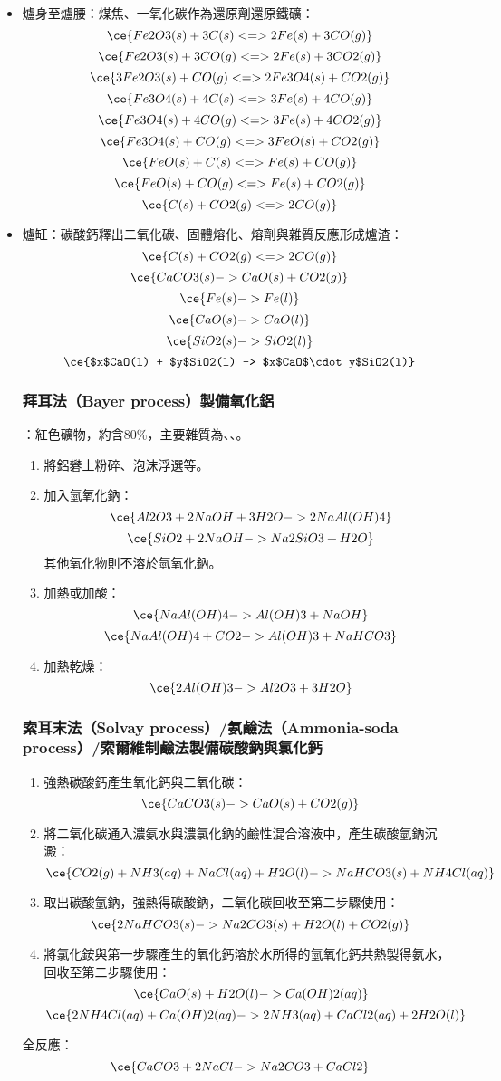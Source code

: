 \documentclass[a4paper,12pt]{report}
\begin{document}
\begin{itemize}
\item 爐身至爐腰：煤焦、一氧化碳作為還原劑還原鐵礦：
\[\ce{Fe2O3(s) + 3C(s) <=> 2Fe(s) + 3CO(g)}\]
\[\ce{Fe2O3(s) + 3CO(g) <=> 2Fe(s) + 3CO2(g)}\]
\[\ce{3Fe2O3(s) + CO(g) <=> 2Fe3O4(s) + CO2(g)}\]
\[\ce{Fe3O4(s) + 4C(s) <=> 3Fe(s) + 4CO(g)}\]
\[\ce{Fe3O4(s) + 4CO(g) <=> 3Fe(s) + 4CO2(g)}\]
\[\ce{Fe3O4(s) + CO(g) <=> 3FeO(s) + CO2(g)}\]
\[\ce{FeO(s) + C(s) <=> Fe(s) + CO(g)}\]
\[\ce{FeO(s) + CO(g) <=> Fe(s) + CO2(g)}\]
\[\ce{C(s) + CO2(g) <=> 2CO(g)}\]
\item 爐缸：碳酸鈣釋出二氧化碳、固體熔化、熔劑與雜質反應形成爐渣：
\[\ce{C(s) + CO2(g) <=> 2CO(g)}\]
\[\ce{CaCO3(s) -> CaO(s) + CO2(g)}\]
\[\ce{Fe(s) -> Fe(l)}\]
\[\ce{CaO(s) -> CaO(l)}\]
\[\ce{SiO2(s) -> SiO2(l)}\]
\[\ce{$x$CaO(l) + $y$SiO2(l) -> $x$CaO$\cdot y$SiO2(l)}\]
\eit
{}
\subsubsection{拜耳法（Bayer process）製備氧化鋁}
：紅色礦物，約含80\%，主要雜質為、、。
\begin{enumerate}
\item 將鋁礬土粉碎、泡沫浮選等。
\item 加入氫氧化鈉：
\[\ce{Al2O3 + 2NaOH + 3H2O -> 2NaAl(OH)4}\]
\[\ce{SiO2 + 2NaOH -> Na2SiO3 + H2O}\]
其他氧化物則不溶於氫氧化鈉。
\item 加熱或加酸：
\[\ce{NaAl(OH)4 -> Al(OH)3 + NaOH}\]
\[\ce{NaAl(OH)4 + CO2 -> Al(OH)3 + NaHCO3}\]
\item 加熱乾燥：
\[\ce{2Al(OH)3 -> Al2O3 + 3H2O}\]
\end{enumerate}
\subsubsection{索耳末法（Solvay process）/氨鹼法（Ammonia-soda process）/索爾維制鹼法製備碳酸鈉與氯化鈣}
\begin{enumerate}
\item 強熱碳酸鈣產生氧化鈣與二氧化碳：
\[\ce{CaCO3(s) -> CaO(s) + CO2(g)}\]
\item 將二氧化碳通入濃氨水與濃氯化鈉的鹼性混合溶液中，產生碳酸氫鈉沉澱：
\[\ce{CO2(g) + NH3(aq) + NaCl(aq) + H2O(l) -> NaHCO3(s) + NH4Cl(aq)}\]
\item 取出碳酸氫鈉，強熱得碳酸鈉，二氧化碳回收至第二步驟使用：
\[\ce{2NaHCO3(s) -> Na2CO3(s) + H2O(l) + CO2(g)}\]
\item 將氯化銨與第一步驟產生的氧化鈣溶於水所得的氫氧化鈣共熱製得氨水，回收至第二步驟使用：
\[\ce{CaO(s) + H2O(l) -> Ca(OH)2(aq)}\]
\[\ce{2NH4Cl(aq) + Ca(OH)2(aq) -> 2NH3(aq) + CaCl2(aq) + 2H2O(l)}\]
\end{enumerate}
全反應：
\[\ce{CaCO3 + 2NaCl -> Na2CO3 + CaCl2}\]

\end{itemize}
\end{document}
